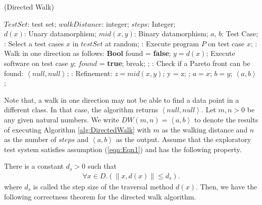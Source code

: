 \documentclass[preprint,1p,authoryear,times]{elsarticle}
\begin{document}
\begin{algorithm}[h] 
\caption{(Directed Walk)}
\label{alg:DirectedWalk}
\begin{small}
\begin{algorithmic}
\Require 
      $TestSet$: test set; 
      $walkDistance$: integer; 
      $steps$: Integer; \\
      $d(x)$: Unary datamorphism;
      $mid(x,y)$: Binary datamorphism; 
\Ensure 
      $a$, $b$: Test Case; \\
: Select a test cases $x$ in $testSet$ at random; 
: Execute program $P$ on test case $x$;
: Walk in one direction as follows:    
\State \textbf{Bool} found = \textbf{false}; 
	\State $y=d(x)$;
	\State Execute software on test case $y$;   
		 {$found$ = \textbf{true};  break; }
	; 
	\EndIf
\EndFor
{}: Check if a Pareto front can be found:
	\Return $\left< null, null \right>$; 
\EndIf
{}: Refinement:
	\State $z = mid(x,y)$;
	 { y = z; }
	\EndIf;
\EndFor
\State  $a = x$; $b = y$; 
\State \Return $\left< a ,b \right>$; \\
\end{algorithmic}
\end{small}
\end{algorithm}

Note that, a walk in one direction may not be able to find a data point in a different class. In that case, the algorithm returns $\left< null, null \right>$. Let $m, n>0$ be any given natural numbers. We write $DW(m,n)=\left< a,b \right>$ to denote the results of executing Algorithm \ref{alg:DirectedWalk} with $m$ as the walking distance and $n$ as the number of $steps$ and $\left< a, b \right>$ as the output. Assume that the exploratory test system satisfies assumption (\ref{eqn:Eqn1}) and has the following property. 

There is a constant $d_s >0$ such that 
\begin{eqnarray}
\forall x \in D.\left( \|x, d(x)\| \leq d_s \right). \label{eqn:Eqn3}
\end{eqnarray}
where  $d_{s}$ is called the step size of the traversal method $d(x)$. 
Then, we have the following correctness theorem for the directed walk algorithm. 
\end{document}
